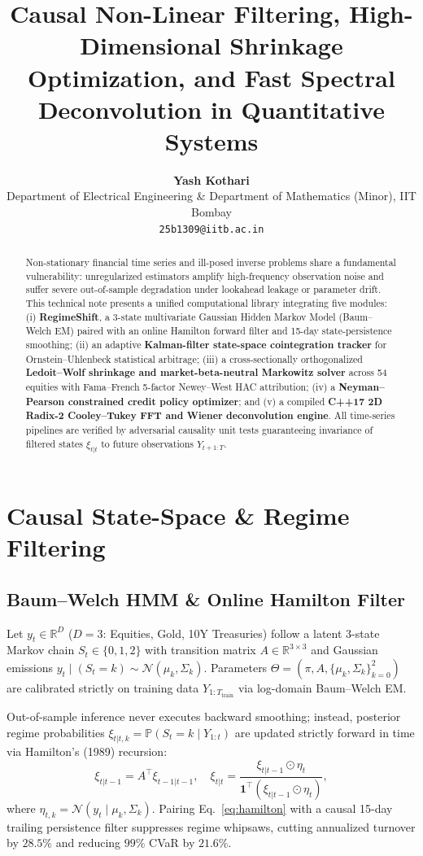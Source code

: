 \documentclass[10pt,a4paper,twocolumn]{article}
\title{\vspace{-1.5em}\textbf{\large Causal Non-Linear Filtering, High-Dimensional Shrinkage Optimization, and Fast Spectral Deconvolution in Quantitative Systems}\vspace{-0.5em}}
\author{\textbf{Yash Kothari} \\ Department of Electrical Engineering \& Department of Mathematics (Minor), IIT Bombay \\ \texttt{25b1309@iitb.ac.in}}
\date{\vspace{-1.2em}}
\begin{document}
\maketitle
\thispagestyle{empty}

\begin{abstract}
\noindent Non-stationary financial time series and ill-posed inverse problems share a fundamental vulnerability: unregularized estimators amplify high-frequency observation noise and suffer severe out-of-sample degradation under lookahead leakage or parameter drift. This technical note presents a unified computational library integrating five modules: (i) \textbf{RegimeShift}, a 3-state multivariate Gaussian Hidden Markov Model (Baum--Welch EM) paired with an online Hamilton forward filter and 15-day state-persistence smoothing; (ii) an adaptive \textbf{Kalman-filter state-space cointegration tracker} for Ornstein--Uhlenbeck statistical arbitrage; (iii) a cross-sectionally orthogonalized \textbf{Ledoit--Wolf shrinkage and market-beta-neutral Markowitz solver} across 54 equities with Fama--French 5-factor Newey--West HAC attribution; (iv) a \textbf{Neyman--Pearson constrained credit policy optimizer}; and (v) a compiled \textbf{C++17 2D Radix-2 Cooley--Tukey FFT and Wiener deconvolution engine}. All time-series pipelines are verified by adversarial causality unit tests guaranteeing invariance of filtered states $\xi_{t|t}$ to future observations $Y_{t+1:T}$.
\end{abstract}

\section{Causal State-Space \& Regime Filtering}
\subsection{Baum--Welch HMM \& Online Hamilton Filter}
Let $y_t \in \mathbb{R}^D$ ($D=3$: Equities, Gold, 10Y Treasuries) follow a latent 3-state Markov chain $S_t \in \{0, 1, 2\}$ with transition matrix $A \in \mathbb{R}^{3\times 3}$ and Gaussian emissions $y_t \mid (S_t = k) \sim \mathcal{N}(\mu_k, \Sigma_k)$. Parameters $\Theta = (\pi, A, \{\mu_k, \Sigma_k\}_{k=0}^2)$ are calibrated strictly on training data $Y_{1:T_{\text{train}}}$ via log-domain Baum--Welch EM.

Out-of-sample inference never executes backward smoothing; instead, posterior regime probabilities $\xi_{t|t,k} = \mathbb{P}(S_t = k \mid Y_{1:t})$ are updated strictly forward in time via Hamilton's (1989) recursion:
\begin{equation}
\xi_{t|t-1} = A^\top \xi_{t-1|t-1}, \quad
\xi_{t|t} = \frac{\xi_{t|t-1} \odot \eta_t}{\mathbf{1}^\top (\xi_{t|t-1} \odot \eta_t)},
\label{eq:hamilton}
\end{equation}
where $\eta_{t,k} = \mathcal{N}(y_t \mid \mu_k, \Sigma_k)$. Pairing Eq.~\eqref{eq:hamilton} with a causal 15-day trailing persistence filter suppresses regime whipsaws, cutting annualized turnover by $28.5\%$ and reducing $99\%$ CVaR by $21.6\%$.
\end{document}
